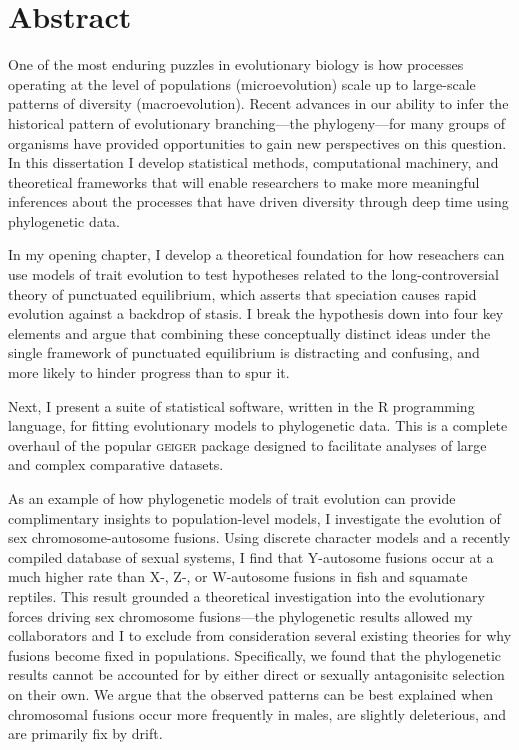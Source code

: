 \chapter*{Abstract}

One of the most enduring puzzles in evolutionary biology is how processes operating at the level of populations (microevolution) scale up to large-scale patterns of diversity (macroevolution). Recent advances in our ability to infer the historical pattern of evolutionary branching---the phylogeny---for many groups of organisms have provided opportunities to gain new perspectives on this question. In this dissertation I develop statistical methods, computational machinery, and theoretical frameworks that will enable researchers to make more meaningful inferences about the processes that have driven diversity through deep time using phylogenetic data.

In my opening chapter, I develop a theoretical foundation for how reseachers can use models of trait evolution to test hypotheses related to the long-controversial theory of punctuated equilibrium, which asserts that speciation causes rapid evolution against a backdrop of stasis. I break the hypothesis down into four key elements and argue that combining these conceptually distinct ideas under the single framework of punctuated equilibrium is distracting and confusing, and more likely to hinder progress than to spur it. 

Next, I present a suite of statistical software, written in the R programming language, for fitting evolutionary models to phylogenetic data. This is a complete overhaul of the popular \textsc{geiger} package designed to facilitate analyses of large and complex comparative datasets.

As an example of how phylogenetic models of trait evolution can provide complimentary insights to population-level models, I investigate the evolution of sex chromosome-autosome fusions. Using discrete character models and a recently compiled database of sexual systems, I find that Y-autosome fusions occur at a much higher rate than X-, Z-, or W-autosome fusions in fish and squamate reptiles. This result grounded a theoretical investigation into the evolutionary forces driving sex chromosome fusions---the phylogenetic results allowed my collaborators and I to exclude from consideration several existing theories for why fusions become fixed in populations. Specifically, we found that the phylogenetic results cannot be accounted for by either direct or sexually antagonisitc selection on their own. We argue that the observed patterns can be best explained when chromosomal fusions occur more frequently in males, are slightly deleterious, and are primarily fix by drift.

